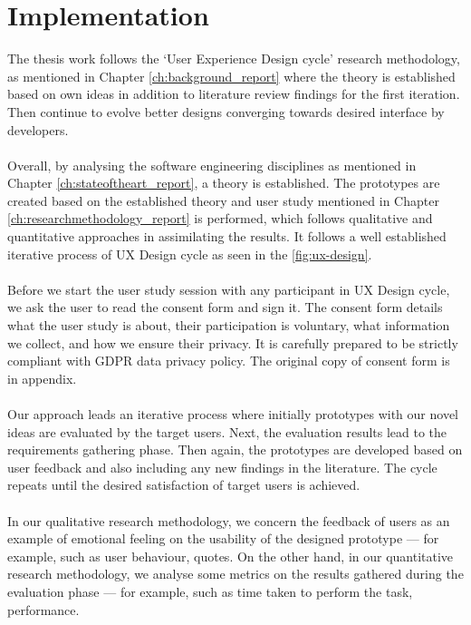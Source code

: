 \clearpage

\section{Implementation}

The thesis work follows the ‘User Experience Design cycle’ research methodology, as mentioned in Chapter \ref{ch:background_report} where the theory is established based on own ideas in addition to literature review findings for the first iteration. Then continue to evolve better designs converging towards desired interface by developers. \\ \\

Overall, by analysing the software engineering disciplines as mentioned in Chapter \ref{ch:stateoftheart_report}, a theory is established. The prototypes are created based on the established theory and user study mentioned in Chapter \ref{ch:researchmethodology_report} is performed, which follows qualitative and quantitative approaches in assimilating the results. It follows a well established iterative process of UX Design cycle \cite{UX} as seen in the \autoref{fig:ux-design}. \\ \\

Before we start the user study session with any participant in UX Design cycle, we ask the user to read the consent form and sign it. The consent form details what the user study is about, their participation is voluntary, what information we collect, and how we ensure their privacy. It is carefully prepared to be strictly compliant with GDPR data privacy policy. \cite{gdpr} The original copy of consent form is in appendix. \\ \\

Our approach leads an iterative process where initially prototypes with our novel ideas are evaluated by the target users. Next, the evaluation results lead to the requirements gathering phase. Then again, the prototypes are developed based on user feedback and also including any new findings in the literature. The cycle repeats until the desired satisfaction of target users is achieved. \\ \\

In our qualitative research methodology, we concern the feedback of users as an example of emotional feeling on the usability of the designed prototype — for example, such as user behaviour, quotes. On the other hand, in our quantitative research methodology, we analyse some metrics on the results gathered during the evaluation phase — for example, such as time taken to perform the task, performance. \\ \\


